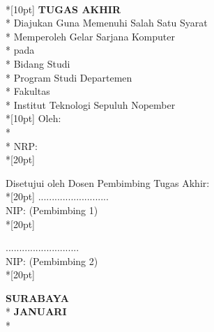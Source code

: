 \newpage
	\thispagestyle{plain}		
		\begin{centering}
			\textbf{\MakeUppercase{\judul}} \\*[10pt]
			\textbf{\large{TUGAS AKHIR}} \\*
			Diajukan Guna Memenuhi Salah Satu Syarat \\*
			Memperoleh Gelar Sarjana Komputer \\*
			pada \\*
			Bidang Studi \bidangStudi \\*
			Program Studi \prodi Departemen \jurusan \\*
			Fakultas \fakultas \\*
			Institut Teknologi Sepuluh Nopember \\*[10pt]
			Oleh: \\*
			\textbf{\penulis} \\*
			NRP: \nrp \\*[20pt]
		\end{centering}
	
		{\noindent Disetujui oleh Dosen Pembimbing Tugas Akhir:}\\*[20pt]         \pembimbingSatu \hfill \hfill .......................... \\
			NIP: \nipPembimbingSatu \hfill \hfill (Pembimbing 1) \\*[20pt]
			
		{\noindent \pembimbingDua  \hfill \hfill ...........................}  \\
		NIP: \nipPembimbingDua \hfill \hfill (Pembimbing 2) \\*[20pt] 
	
		\begin{centering}
			\textbf{SURABAYA} \\*
			\textbf{JANUARI \tahun} \\*
		\end{centering}
		\cleardoublepage